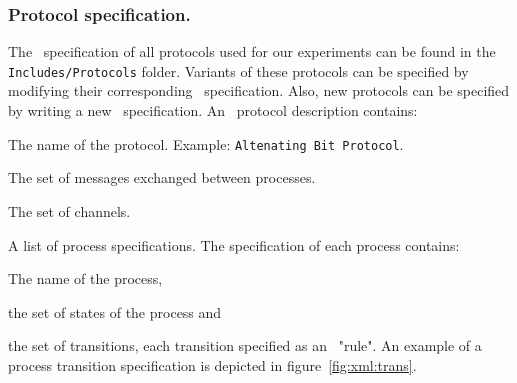 \subsubsection*{Protocol specification.}

The \Xml\ specification of all protocols used for our experiments can be found in the \texttt{Includes/Protocols} folder.
%
Variants of these protocols can be specified by modifying their corresponding \Xml\ specification.
Also, new protocols can be specified by writing a new \xml\ specification.
%
An \Xml\ protocol description contains:
\begin{inparaenum}
\item The name of the protocol. Example: \texttt{Altenating Bit Protocol}.
\item The set of messages exchanged between processes.
\item The set of channels.
\item A list of process specifications. The specification of each process contains:
\begin{inparaenum}
\item The name of the process,
\item the set of states of the process and
\item the set of transitions, each transition specified as an \Xml\ "rule". An example of a process transition specification is depicted in figure~\ref{fig:xml:trans}.
\end{inparaenum}
\end{inparaenum}

